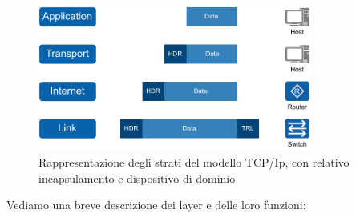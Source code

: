 \begin{figure}[H]
    \centering
    \includegraphics[width=0.8\textwidth]{immagini/diag2-modello_a_strati}
    \caption{Rappresentazione degli strati del modello TCP/Ip, con relativo incapsulamento e dispositivo di dominio}
    \label{fig:modello-a-strati}
\end{figure}



Vediamo una breve descrizione dei layer e delle loro funzioni:

